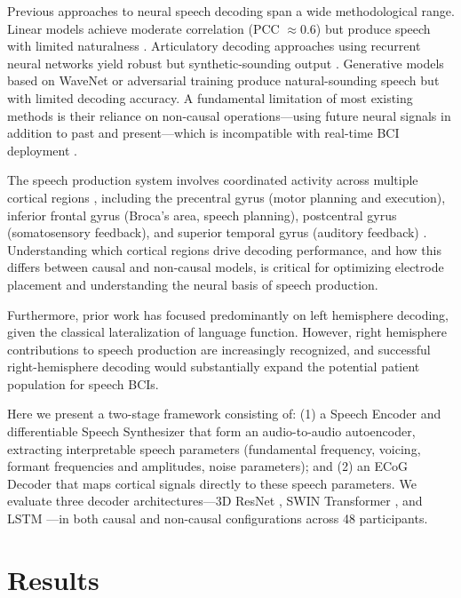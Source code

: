 \documentclass[11pt]{article}
\begin{document}
Previous approaches to neural speech decoding span a wide methodological range. Linear models achieve moderate correlation (PCC $\approx 0.6$) but produce speech with limited naturalness \citep{herff2015}. Articulatory decoding approaches using recurrent neural networks yield robust but synthetic-sounding output \citep{anumanchipalli2019, chartier2018}. Generative models based on WaveNet \citep{oord2016} or adversarial training produce natural-sounding speech but with limited decoding accuracy. A fundamental limitation of most existing methods is their reliance on non-causal operations---using future neural signals in addition to past and present---which is incompatible with real-time BCI deployment \citep{lotte2018}.

The speech production system involves coordinated activity across multiple cortical regions \citep{hickok2007}, including the precentral gyrus (motor planning and execution), inferior frontal gyrus (Broca's area, speech planning), postcentral gyrus (somatosensory feedback), and superior temporal gyrus (auditory feedback) \citep{mugler2018}. Understanding which cortical regions drive decoding performance, and how this differs between causal and non-causal models, is critical for optimizing electrode placement and understanding the neural basis of speech production.

Furthermore, prior work has focused predominantly on left hemisphere decoding, given the classical lateralization of language function. However, right hemisphere contributions to speech production are increasingly recognized, and successful right-hemisphere decoding would substantially expand the potential patient population for speech BCIs.

Here we present a two-stage framework consisting of: (1) a Speech Encoder and differentiable Speech Synthesizer that form an audio-to-audio autoencoder, extracting interpretable speech parameters (fundamental frequency, voicing, formant frequencies and amplitudes, noise parameters); and (2) an ECoG Decoder that maps cortical signals directly to these speech parameters. We evaluate three decoder architectures---3D ResNet \citep{he2016}, SWIN Transformer \citep{liu2021}, and LSTM \citep{hochreiter1997}---in both causal and non-causal configurations across 48 participants.

\section{Results}
\end{document}
